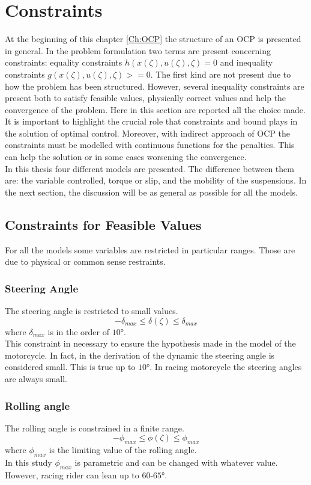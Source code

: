 \section{Constraints}
%
At the beginning of this chapter \ref{Ch:OCP} the structure of an OCP is presented in general. In the problem formulation two terms are present concerning constraints: equality constraints $h(x(\zeta),u(\zeta),\zeta)=0$ and inequality constraints $g(x(\zeta),u(\zeta),\zeta)>=0$. The first kind are not present due to how the problem has been structured. However, several inequality constraints are present both to satisfy feasible values, physically correct values and help the convergence of the problem. Here in this section are reported all the choice made.\\
It is important to highlight the crucial role that constraints and bound plays in the solution of optimal control. Moreover, with indirect approach of OCP the constraints must be modelled with continuous functions for the penalties. This can help the solution or in some cases worsening the convergence.\\
In this thesis four different models are presented. The difference between them are: the variable controlled, torque or slip, and the mobility of the suspensions. In the next section, the discussion will be as general as possible for all the models.
%
\subsection{Constraints for Feasible Values}
%
For all the models some variables are restricted in particular ranges. Those are due to physical or common sense restraints.
%
\subsubsection*{Steering Angle}
The steering angle is restricted to small values. 
%
\begin{equation}
    -\delta_{max} \le \delta(\zeta) \le \delta_{max}
\end{equation}
%
where $\delta_{max}$ is in the order of $10 \si{\degree}$.\\
This constraint in necessary to ensure the hypothesis made in the model of the motorcycle. In fact, in the derivation of the dynamic the steering angle is considered small. This is true up to $10 \si{\degree}$. In racing motorcycle the steering angles are always small.
%
\subsubsection*{Rolling angle}
%
The rolling angle is constrained in a finite range.
%
\begin{equation}
    -\phi_{max} \le \phi(\zeta) \le \phi_{max}
\end{equation}
%
where $\phi_{max}$ is the limiting value of the rolling angle.\\ 
In this study $\phi_{max}$ is parametric and can be changed with whatever value. However, racing rider can lean up to $60$-$65 \si{\degree}$.
%
